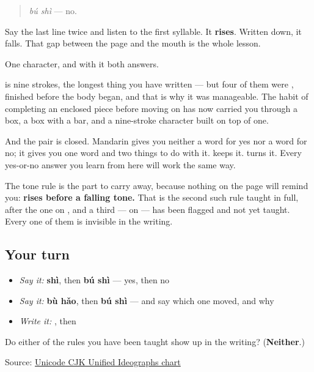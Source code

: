 \begin{quote}
\emph{bú shì} — no.
\end{quote}

Say the last line twice and listen to the first syllable. It \textbf{rises}. Written down, it falls. That gap between the page and the mouth is the whole lesson.

\begin{grammarlens}[title={What you've built this chapter}]
One character, and with it both answers.

\textbf{} is nine strokes, the longest thing you have written — but four of them were , finished before the body began, and that is why it was manageable. The habit of completing an enclosed piece before moving on has now carried you through a box, a box with a bar, and a nine-stroke character built on top of one.

And the pair is closed. Mandarin gives you neither a word for yes nor a word for no; it gives you one word and two things to do with it. \textbf{} keeps it. \textbf{} turns it. Every yes-or-no answer you learn from here will work the same way.

The tone rule is the part to carry away, because nothing on the page will remind you: \textbf{ rises before a falling tone.} That is the second such rule taught in full, after the one on , and a third — on  — has been flagged and not yet taught. Every one of them is invisible in the writing.
\end{grammarlens}

\subsection*{Your turn}
\begin{itemize}
\raggedright
  \item \emph{Say it:} \textbf{shì}, then \textbf{bú shì} — yes, then no
  \item \emph{Say it:} \textbf{bù hǎo}, then \textbf{bú shì} — and say which one moved, and why
  \item \emph{Write it:} , then 
\end{itemize}

\begin{tcolorbox}[breakable,colback=teal!4,colframe=teal!35!black,title={Before you move on}]
Do either of the rules you have been taught show up in the writing? (\textbf{Neither}.)

Source: \href{https://www.unicode.org/charts/PDF/U4E00.pdf}{Unicode CJK Unified Ideographs chart}
\end{tcolorbox}
